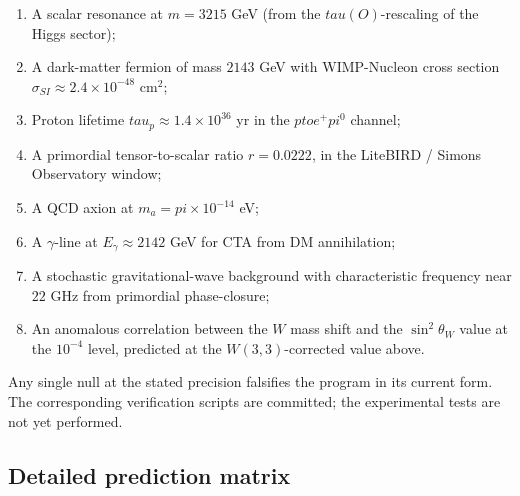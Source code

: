 \documentclass[11pt]{article}
\def\text#1{#1}%
\def\pi{pi}%
\def\tau{tau}%
\def\to{ to }%
\begin{document}
\begin{enumerate}[leftmargin=2em]
\item A scalar resonance at $m = 3215$ GeV (from the $\tau(O)$-rescaling of the Higgs sector);
\item A dark-matter fermion of mass $2143$ GeV with WIMP-Nucleon cross section $\sigma_{\text{SI}} \approx 2.4\times10^{-48}$ cm$^2$;
\item Proton lifetime $\tau_p \approx 1.4\times 10^{36}$ yr in the $p \to e^+ \pi^0$ channel;
\item A primordial tensor-to-scalar ratio $r = 0.0222$, in the LiteBIRD / Simons Observatory window;
\item A QCD axion at $m_a = \pi\times 10^{-14}$ eV;
\item A $\gamma$-line at $E_\gamma \approx 2142$ GeV for CTA from DM annihilation;
\item A stochastic gravitational-wave background with characteristic frequency near $22$ GHz from primordial phase-closure;
\item An anomalous correlation between the $W$ mass shift and the $\sin^2\theta_W$ value at the $10^{-4}$ level, predicted at the $W(3,3)$-corrected value above.
\end{enumerate}

Any single null at the stated precision falsifies the program in its current form. The corresponding verification scripts are committed; the experimental tests are not yet performed.

\subsection*{Detailed prediction matrix}
\end{document}
